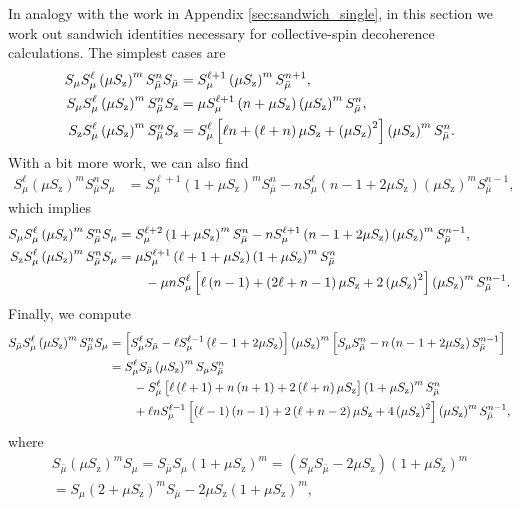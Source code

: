 \documentclass[aps,notitlepage,nofootinbib,11pt]{revtex4-1}
\newcommand{\p}[1]{\left(#1\right)} %
\renewcommand{\sp}[1]{\left[#1\right]} %
\newcommand{\z}{\text{z}}
\newcommand{\bmu}{{\bar\mu}}
\newcommand{\1}{\mathds{1}}
\begin{document}
In analogy with the work in Appendix \ref{sec:sandwich_single}, in
this section we work out sandwich identities necessary for
collective-spin decoherence calculations.  The simplest cases are
\begin{align}
  S_\mu S_\mu^\ell \p{\mu S_\z}^m S_\bmu^n S_\bmu
  &= S_\mu^{\ell+1} \p{\mu S_\z}^m S_\bmu^{n+1},
  \allowdisplaybreaks \\
  S_\mu S_\mu^\ell \p{\mu S_\z}^m S_\bmu^n S_\z
  &= \mu S_\mu^{\ell+1} \p{n+\mu S_\z} \p{\mu S_\z}^m S_\bmu^n,
  \allowdisplaybreaks \\
  S_\z S_\mu^\ell \p{\mu S_\z}^m S_\bmu^n S_\z
  &= S_\mu^\ell \sp{\ell n + \p{\ell+n} \mu S_\z + \p{\mu S_\z}^2}
  \p{\mu S_\z}^m S_\bmu^n.
\end{align}
With a bit more work, we can also find
\begin{align}
  S_\mu^\ell \p{\mu S_\z}^m S_\bmu^n S_\mu
  &= S_\mu^{\ell+1} \p{1+\mu S_\z}^m S_\bmu^n
  - n S_\mu^\ell \p{n-1+2\mu S_\z} \p{\mu S_\z}^m S_\bmu^{n-1},
\end{align}
which implies
\begin{align}
  S_\mu S_\mu^\ell \p{\mu S_\z}^m S_\bmu^n S_\mu
  &= S_\mu^{\ell+2} \p{1+\mu S_\z}^m S_\bmu^n
  - n S_\mu^{\ell+1} \p{n-1+2\mu S_\z} \p{\mu S_\z}^m S_\bmu^{n-1},
  \allowdisplaybreaks \\
  S_\z S_\mu^\ell \p{\mu S_\z}^m S_\bmu^n S_\mu
  &= \mu S_\mu^{\ell+1} \p{\ell+1+\mu S_\z} \p{1+\mu S_\z}^m S_\bmu^n
  \notag \\
  &\qquad - \mu n S_\mu^\ell
  \sp{\ell\p{n-1} + \p{2\ell+n-1}\mu S_\z + 2\p{\mu S_\z}^2}
  \p{\mu S_\z}^m S_\bmu^{n-1}.
\end{align}
Finally, we compute
\begin{align}
  S_\bmu S_\mu^\ell \p{\mu S_\z}^m S_\bmu^n S_\mu
  &= \sp{S_\mu^\ell S_\bmu - \ell S_\mu^{\ell-1} \p{\ell-1+2\mu S_\z}}
  \p{\mu S_\z}^m
  \sp{S_\mu S_\bmu^n - n \p{n-1+2\mu S_\z} S_\bmu^{n-1}} \notag \\
  &= S_\mu^\ell S_\bmu \p{\mu S_\z}^m S_\mu S_\bmu^n \notag \\
  &\qquad - S_\mu^\ell
  \sp{\ell\p{\ell+1} + n\p{n+1}+2\p{\ell+n}\mu S_\z}
  \p{1+\mu S_\z}^m S_\bmu^n \notag \\
  &\qquad + \ell n S_\mu^{\ell-1}
  \sp{\p{\ell-1}\p{n-1}+2\p{\ell+n-2}\mu S_\z + 4\p{\mu S_\z}^2}
  \p{\mu S_\z}^m S_\bmu^{n-1},
\end{align}
where
\begin{multline}
  S_\bmu \p{\mu S_\z}^m S_\mu
  = S_\bmu S_\mu \p{1+\mu S_\z}^m
  = \p{S_\mu S_\bmu - 2\mu S_\z} \p{1+\mu S_\z}^m \\
  = S_\mu \p{2+\mu S_\z}^m S_\bmu - 2\mu S_\z \p{1+\mu S_\z}^m,
\end{multline}
\end{document}
